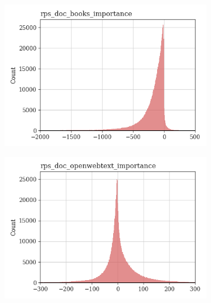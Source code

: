 \documentclass{article}
\begin{document}
\begin{figure}
    \centering
    \begin{subfigure}[b]{0.32\textwidth}
        \centering
        \includegraphics[width=\textwidth]{figures/quality_signals/rps_doc_books_importance.png}
    \end{subfigure}
    \hfill
    \begin{subfigure}[b]{0.32\textwidth}
        \centering
        \includegraphics[width=\textwidth]{figures/quality_signals/rps_doc_openwebtext_importance.png}
    \end{subfigure}
    \hfill
    \begin{subfigure}[b]{0.32\textwidth}
        \centering

\end{subfigure}
\end{figure}
\end{document}

